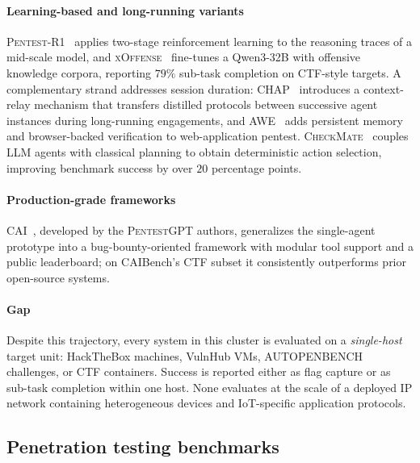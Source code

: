 \paragraph{Learning-based and long-running variants}
\textsc{Pentest-R1}~\cite{pentestr125} applies two-stage reinforcement
learning to the reasoning traces of a mid-scale model, and
\textsc{xOffense}~\cite{xoffense25} fine-tunes a Qwen3-32B with offensive
knowledge corpora, reporting $79\%$ sub-task completion on CTF-style targets.
A complementary strand addresses session duration:
\textsc{CHAP}~\cite{chap26} introduces a context-relay mechanism that
transfers distilled protocols between successive agent instances during
long-running engagements, and \textsc{AWE}~\cite{awe26} adds persistent memory
and browser-backed verification to web-application pentest.
\textsc{CheckMate}~\cite{checkmate25} couples LLM agents with classical
planning to obtain deterministic action selection, improving benchmark
success by over $20$ percentage points.

\paragraph{Production-grade frameworks}
\textsc{CAI}~\cite{cai25}, developed by the \textsc{PentestGPT} authors,
generalizes the single-agent prototype into a bug-bounty-oriented framework
with modular tool support and a public leaderboard; on CAIBench's CTF subset
it consistently outperforms prior open-source systems.

\paragraph{Gap}
Despite this trajectory, every system in this cluster is evaluated on a
\emph{single-host} target unit: HackTheBox machines, VulnHub VMs,
AUTOPENBENCH challenges, or CTF containers. Success is reported either as
flag capture or as sub-task completion within one host.
None evaluates at the scale of a deployed IP network containing heterogeneous
devices and IoT-specific application protocols.

\subsection{Penetration testing benchmarks}
\label{sec:related:bench}

